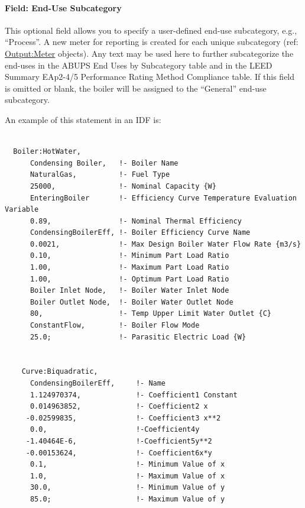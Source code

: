 \paragraph{Field: End-Use Subcategory}\label{end-use-subcategory-10}

This optional field allows you to specify a user-defined end-use subcategory, e.g., ``Process''. A new meter for reporting is created for each unique subcategory (ref: \hyperref[outputmeter-and-outputmetermeterfileonly]{Output:Meter} objects). Any text may be used here to further subcategorize the end-uses in the ABUPS End Uses by Subcategory table and in the LEED Summary EAp2-4/5 Performance Rating Method Compliance table. If this field is omitted or blank, the boiler will be assigned to the ``General'' end-use subcategory.

An example of this statement in an IDF is:

\begin{lstlisting}

  Boiler:HotWater,
      Condensing Boiler,   !- Boiler Name
      NaturalGas,          !- Fuel Type
      25000,               !- Nominal Capacity {W}
      EnteringBoiler       !- Efficiency Curve Temperature Evaluation Variable
      0.89,                !- Nominal Thermal Efficiency
      CondensingBoilerEff, !- Boiler Efficiency Curve Name
      0.0021,              !- Max Design Boiler Water Flow Rate {m3/s}
      0.10,                !- Minimum Part Load Ratio
      1.00,                !- Maximum Part Load Ratio
      1.00,                !- Optimum Part Load Ratio
      Boiler Inlet Node,   !- Boiler Water Inlet Node
      Boiler Outlet Node,  !- Boiler Water Outlet Node
      80,                  !- Temp Upper Limit Water Outlet {C}
      ConstantFlow,        !- Boiler Flow Mode
      25.0;                !- Parasitic Electric Load {W}


    Curve:Biquadratic,
      CondensingBoilerEff,     !- Name
      1.124970374,             !- Coefficient1 Constant
      0.014963852,             !- Coefficient2 x
     -0.02599835,              !- Coefficient3 x**2
      0.0,                     !-Coefficient4y
     -1.40464E-6,              !-Coefficient5y**2
     -0.00153624,              !- Coefficient6x*y
      0.1,                     !- Minimum Value of x
      1.0,                     !- Maximum Value of x
      30.0,                    !- Minimum Value of y
      85.0;                    !- Maximum Value of y
\end{lstlisting}

